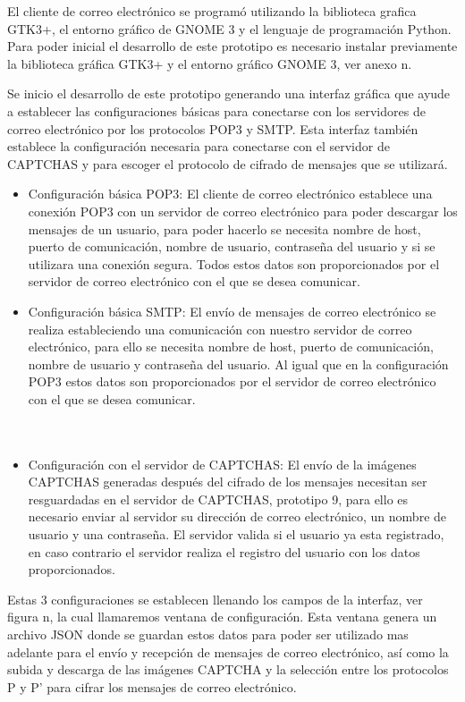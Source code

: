 \documentclass[12pt,oneside,onecolumn,openany]{report}
\begin{document}
El cliente de correo electrónico se programó utilizando la biblioteca grafica GTK3+, el entorno gráfico de GNOME 3 y el lenguaje de programación Python. Para poder inicial el desarrollo de este prototipo es necesario instalar previamente la biblioteca gráfica GTK3+ y el entorno gráfico GNOME 3, ver anexo n. 

Se inicio el desarrollo de este prototipo generando una interfaz gráfica que ayude a establecer las configuraciones básicas para conectarse con los servidores de correo electrónico por los protocolos POP3 y SMTP. Esta interfaz también establece la configuración necesaria para conectarse con el servidor de CAPTCHAS y para escoger el protocolo de cifrado de mensajes que se utilizará.
\begin{itemize}
 \item Configuración básica POP3: El cliente de correo electrónico establece una conexión POP3 con un servidor de correo electrónico para poder descargar los mensajes de un usuario, para poder hacerlo se necesita nombre de host, puerto de comunicación, nombre de usuario, contraseña del usuario y si se utilizara una conexión segura. Todos estos datos son proporcionados por el servidor de correo electrónico con el que se desea comunicar.
 \item Configuración básica SMTP: El envío de mensajes de correo electrónico se realiza estableciendo una comunicación con nuestro servidor de correo electrónico, para ello se necesita nombre de host, puerto de comunicación, nombre de usuario y contraseña del usuario. Al igual que en la configuración POP3 estos datos son proporcionados por el servidor de correo electrónico con el que se desea comunicar.\\\\\\
 \item Configuración con el servidor de CAPTCHAS: El envío de la imágenes CAPTCHAS generadas después del cifrado de los mensajes necesitan ser resguardadas en el servidor de CAPTCHAS, prototipo 9, para ello es necesario enviar al servidor su dirección de correo electrónico, un nombre de usuario y una contraseña. El servidor valida si el usuario ya esta registrado, en caso contrario el servidor realiza el registro del usuario con los datos proporcionados.
\end{itemize}
Estas 3 configuraciones se establecen llenando los campos de la interfaz, ver figura n, la cual llamaremos ventana de configuración. Esta ventana genera un archivo JSON donde se guardan estos datos para poder ser utilizado mas adelante para el envío y recepción de mensajes de correo electrónico, así como la subida y descarga de las imágenes CAPTCHA y la selección entre los protocolos P y P’ para cifrar los mensajes de correo electrónico.
\end{document}
